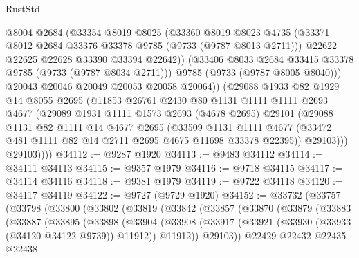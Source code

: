 \begin{lexlean}{RustStd}
\begin{coremodule}
{\begin{coremodule}
{{{{{{{{{{{{{{{{{{{{{{{{{{{{{{{{{{{{{{{{{{{{{{{{{{{{{{{                @8004
                @2684
                (@33354
                  @8019
                  @8025
                  (@33360
                    @8019
                    @8023
                    @4735
                    (@33371 @8012 @2684 @33376 @33378 @9785 (@9733 (@9787 @8013 @2711)))
                    @22622
                    @22625
                    @22628
                    @33390
                    @33394
                    @22642))
                (@33406 @8033 @2684 @33415 @33378 @9785 (@9733 (@9787 @8034 @2711)))
                @9785
                (@9733 (@9787 @8005 @8040)))
              @20043
              @20046
              @20049
              @20053
              @20058
              @20064))
          (@29088
            @1933
            @82
            @1929
            @14
            @8055
            @2695
            (@11853
              @26761
              @2430
              @80
              @1131
              @1111
              @1111
              @2693
              @4677
              (@29089
                @1931
                @1111
                @1573
                @2693
                (@4678 @2695)
                @29101
                (@29088
                  @1131
                  @82
                  @1111
                  @14
                  @4677
                  @2695
                  (@33509
                    @1131
                    @1111
                    @4677
                    (@33472 @481 @1111 @82 @14 @2711 @2695 @4675 @11698 @33378 @22395))
                  @29103)))
            @29103))))
@34112 := @9287 @1920
@34113 := @9483 @34112
@34114 := @34111 @34113
@34115 := @9357 @1979
@34116 := @9718 @34115
@34117 := @34114 @34116
@34118 := @9381 @1979
@34119 := @9722 @34118
@34120 := @34117 @34119
@34122 := @9727 (@9729 @1920)
@34152 := @33732
    (@33757
      (@33798
        (@33800
          (@33802
            (@33819
              (@33842
                (@33857
                  (@33870
                    (@33879
                      (@33883
                        (@33887
                          (@33895
                            (@33898
                              (@33904
                                (@33908
                                  (@33917
                                    (@33921 (@33930 (@33933 (@34120 @34122 @9739)) @11912))
                                    @11912))
                                @29103))
                            @22429
                            @22432
                            @22435
                            @22438
}}}}}}}}}}}}}}}}}}}}}}}}}}}}}}}}}}}}}}}}}}}}}}}}}}}}}}}
\end{coremodule}}
\end{coremodule}
\end{lexlean}
